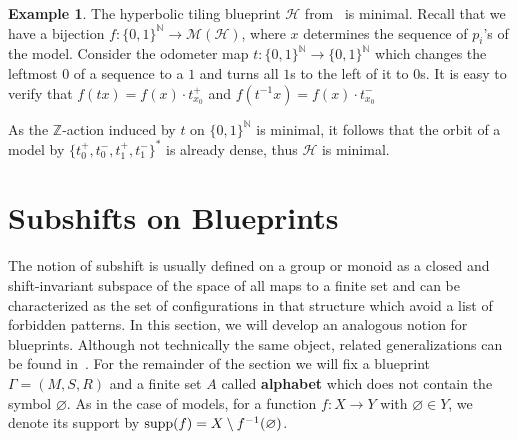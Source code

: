\documentclass{article}
\theoremstyle{definition}
\newtheorem{example}[theorem]{Example} %
\theoremstyle{definition}
\newcommand{\N}{\mathbb{N}}
\newcommand{\ZZ}{\mathbb{Z}}
\newcommand{\M}{\mathcal{M}}
\newcommand{\supp}{\textnormal{supp}}
\newcommand{\define}[1]{\textbf{#1}}
\begin{document}
\begin{example}
   The hyperbolic tiling blueprint $\mathcal{H}$ from~ is minimal. Recall that we have a bijection $f\colon\{0,1\}^\N \to \M(\mathcal{H})$, where $x$ determines the sequence of $p_i$'s of the model. Consider the odometer map $t\colon\{0,1\}^\N\to \{0,1\}^\N$ which changes the leftmost $0$ of a sequence to a $1$ and turns all $1$s to the left of it to $0$s. It is easy to verify that $f(tx) = f(x)\cdot t^+_{x_0}$ and $f(t^{-1}x) = f(x)\cdot t^-_{x_0}$

   As the $\ZZ$-action induced by $t$ on $\{0,1\}^\N$ is minimal, it follows that the orbit of a model by $\{t_0^+,t_0^-,t_1^+,t_1^-\}^*$ is already dense, thus $\mathcal{H}$ is minimal. 
\end{example}


%
\section{Subshifts on Blueprints}
\label{sec:subshifts}

The notion of subshift is usually defined on a group or monoid as a closed and shift-invariant subspace of the space of all maps to a finite set and can be characterized as the set of configurations in that structure which avoid a list of forbidden patterns. In this section, we will develop an analogous notion for blueprints. Although not technically the same object, related generalizations can be found in~\cite{aubrun2019domino, bartholdi2022monadic, barbieri2016domino, bartholdi2020simulations,arrighi2023graph}. For the remainder of the section we will fix a blueprint $\Gamma = (M,S,R)$ and a finite set $A$ called \define{alphabet} which does not contain the symbol $\varnothing$. As in the case of models, for a function $f\colon X \to Y$ with $\varnothing \in Y$, we denote its support by $\supp(f) = X\setminus f^{-1}(\varnothing)$. \\
\end{document}
